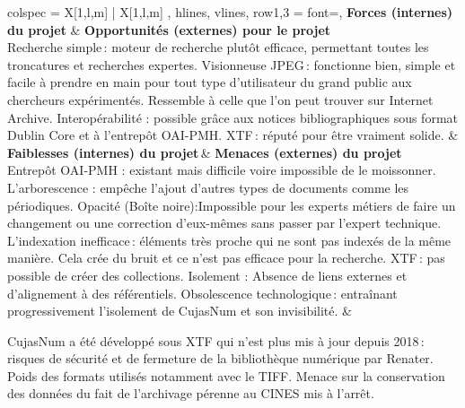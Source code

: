 \begin{table}[H]
\centering
\caption{Analyse SWOT de CujasNum}
\label{tab:swot_cujasnum}
\vspace{0.3cm}
\begin{tblr}{
	colspec = { X[1,l,m] | X[1,l,m] },
	hlines,
	vlines,
	row{1,3} = {font=\bfseries},%
	}
	\textbf{Forces (internes) du projet} & \textbf{Opportunités (externes) pour le projet} \\
	
	Recherche simple : moteur de recherche plutôt efficace, permettant toutes les troncatures et recherches expertes.
	Visionneuse JPEG : fonctionne bien, simple et facile à prendre en main pour tout type d’utilisateur du grand public aux chercheurs expérimentés. Ressemble à celle que l’on peut trouver sur Internet Archive.
	Interopérabilité : possible grâce aux notices bibliographiques sous format Dublin Core et à l’entrepôt OAI-PMH.
	XTF : réputé pour être vraiment solide.
	&
	 \\
	
	\textbf{Faiblesses (internes) du projet} & \textbf{Menaces (externes) du projet} \\ 
	
	Entrepôt OAI-PMH : existant mais difficile voire impossible de le moissonner. 
	L’arborescence : empêche l’ajout d’autres types de documents comme les périodiques.
	Opacité (Boîte noire):Impossible pour les experts métiers de faire un changement ou une correction d’eux-mêmes sans  passer par l’expert technique.
	L’indexation inefficace : éléments très proche qui ne sont pas indexés de la même manière. Cela crée du bruit et ce n’est pas efficace pour la recherche.
	XTF : pas possible de créer des collections.
	Isolement : Absence de liens externes et d’alignement à des référentiels.
	Obsolescence technologique : entraînant progressivement l’isolement de CujasNum et son invisibilité.
	&
	
	CujasNum a été développé sous XTF qui n’est plus mis à jour depuis 2018 : risques de sécurité et de fermeture de la bibliothèque numérique par Renater.
	Poids des formats utilisés notamment avec le TIFF.
	Menace sur la conservation des données du fait de l’archivage pérenne au CINES mis à l’arrêt.\\
	
	\end{tblr}
\end{table}

